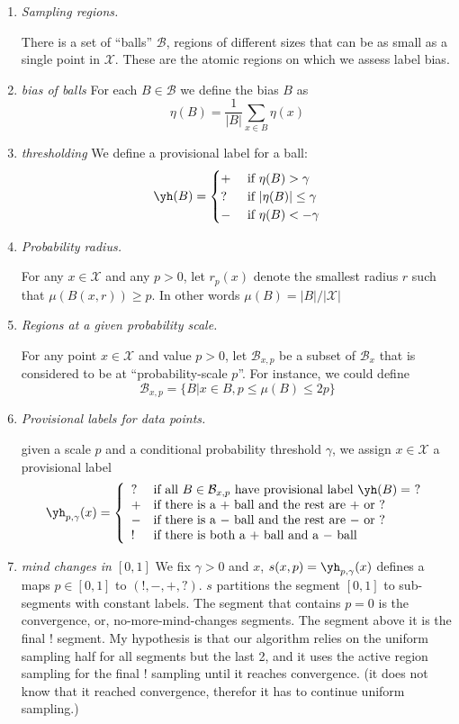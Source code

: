 \documentclass{article}
\def\X{{\mathcal X}}
\def\B{{\mathcal B}}
\begin{document}
\begin{enumerate}

\item {\it Sampling regions.}

There is a set of ``balls'' $\B$, regions of different sizes that can be as small as a single point in $\X$. These are the atomic regions on which we assess label bias. 

\item {\it bias of balls} For each $B \in \B$ we define the bias $B$ as 
$$ \eta(B) = \frac{1}{|B|} \sum_{x \in B}\eta(x) $$
\item {\it thresholding}
We define a provisional label for a ball:
$$\yh(B) =  
\begin{cases}
+ & \mbox{ if } \eta(B)>\gamma \\
? & \mbox{ if } |\eta(B)| \leq \gamma \\
- & \mbox{ if } \eta(B)<-\gamma 
\end{cases}
$$

\item {\it Probability radius.}

For any $x \in \X$ and any $p > 0$, let $r_p(x)$ denote the smallest radius $r$ such that $\mu(B(x, r)) \geq p$. 
In other words $\mu(B) = |B| / |\X|$

\item {\it Regions at a given probability scale.}

For any point $x \in \X$ and value $p > 0$, let $\B_{x,p}$ be a subset of $\B_x$ that is considered to be at ``probability-scale $p$''. For instance, we could define
$$ \B_{x,p} = \{B | x \in B, p\leq \mu(B) \leq 2p\}$$

\item {\it Provisional labels for data points.}

given a scale $p$ and a conditional probability threshold $\gamma$, we  assign $x \in \X$ a provisional label
$$ \yh_{p,\gamma}(x) = 
\left\{
\begin{array}{ll}
? & \mbox{if all $B \in \B_{x,p}$ have provisional label $\yh(B) = \ ?$} \\
+ & \mbox{if there is a $+$ ball and the rest are $+$ or $?$} \\ 
- & \mbox{if there is a $-$ ball and the rest are $-$ or $?$} \\ 
! & \mbox{if there is both a $+$ ball and a $-$ ball}
\end{array}
\right.
$$

\item{\it mind changes in $[0,1]$}
We fix $\gamma>0$ and $x$, $s(x,p) = \yh_{p,\gamma}(x)$ defines a maps $p \in [0,1]$ to $(!,-,+,?)$.
$s$ partitions the segment $[0,1]$ to sub-segments with constant labels. The segment that contains $p=0$ is the convergence, or, no-more-mind-changes segments. The segment above it is the final $!$ segment. My hypothesis is that our algorithm relies on the uniform sampling half for all segments but the last 2, and it uses the active region sampling for the final $!$ sampling until it reaches convergence. (it does not know that it reached convergence, therefor it has to continue uniform sampling.)



\end{enumerate}
\end{document}
